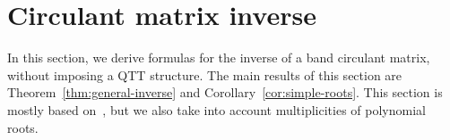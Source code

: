 \documentclass[a4paper]{article}
\newcommand{\LL}{L}
\begin{document}




	
\section{Circulant matrix inverse} \label{sec:circ}

In this section, we derive formulas for the inverse of a band circulant matrix, without imposing a QTT structure.
The main results of this section are Theorem~\ref{thm:general-inverse} and Corollary~\ref{cor:simple-roots}.
This section is mostly based on~\cite{fuyong2011inverse}, but we also take into account multiplicities of polynomial roots.
\end{document}
